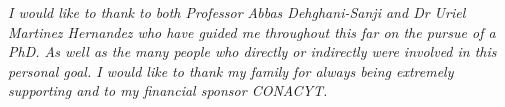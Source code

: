 

\begin{acknowledgements}      %

\setlength{\parindent}{17.62482pt}
\setlength{\parskip}{0.0pt plus 1.0pt}

\textit{I would like to thank to both Professor Abbas Dehghani-Sanji and Dr Uriel Martinez Hernandez who have guided me throughout this far on the pursue of a PhD. As well as the many people who directly or indirectly were involved in this personal goal. I would like to thank my family for always being extremely supporting and to my financial sponsor CONACYT.}

\end{acknowledgements}


